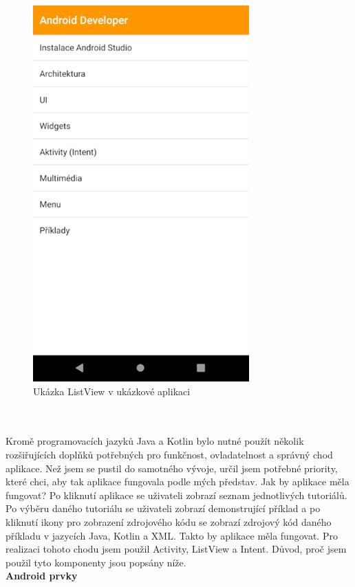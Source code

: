 \documentclass{vskpou} %
\begin{document}
 \begin{figure}[h!]
\centering
\includegraphics[scale=0.5]{images/19.jpg}
\caption{Ukázka ListView v ukázkové aplikaci}
\label{19}
\end{figure}
\\
\\Kromě programovacích jazyků Java a Kotlin bylo nutné použít několik rozšiřujících doplňků potřebných pro funkčnost, ovladatelnost a správný chod aplikace. Než jsem se pustil do samotného vývoje, určil jsem potřebné priority, které chci, aby tak aplikace fungovala podle mých představ. Jak by aplikace měla fungovat? Po kliknutí aplikace se uživateli zobrazí seznam jednotlivých tutoriálů. Po výběru daného tutoriálu se uživateli zobrazí demonstrující příklad a po kliknutí ikony pro zobrazení zdrojového kódu se zobrazí zdrojový kód daného příkladu v jazycích Java, Kotlin a XML. Takto by aplikace měla fungovat. Pro realizaci tohoto chodu jsem použil Activity, ListView a Intent. Důvod, proč jsem použil tyto komponenty jsou popsány níže.
\\
\newpage
\textbf{Android prvky}
\end{document}
